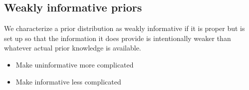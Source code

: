 \documentclass[letterpaper,10pt,english]{jupyterBook}
\begin{document}
\subsection{Weakly informative priors}
\label{\detokenize{Lecture 3:weakly-informative-priors}}
\sphinxAtStartPar
We characterize a prior distribution as weakly informative if it is proper but is set up so that the information it does provide is intentionally weaker than whatever actual prior knowledge is available.
\begin{itemize}
\item {} 
\sphinxAtStartPar
Make uninformative more complicated

\item {} 
\sphinxAtStartPar
Make informative less complicated

\end{itemize}
\end{document}
